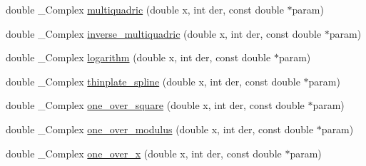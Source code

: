 \begin{CompactItemize}
\item 
\hypertarget{group__applications__fastsum_g44a58143a1f5c79b45c538134117e091}{
double \_\-Complex \hyperlink{group__applications__fastsum_g44a58143a1f5c79b45c538134117e091}{multiquadric} (double x, int der, const double $\ast$param)}
\label{group__applications__fastsum_g44a58143a1f5c79b45c538134117e091}

\item 
\hypertarget{group__applications__fastsum_g889c2a1791e42bb8fa5a594588d68a5c}{
double \_\-Complex \hyperlink{group__applications__fastsum_g889c2a1791e42bb8fa5a594588d68a5c}{inverse\_\-multiquadric} (double x, int der, const double $\ast$param)}
\label{group__applications__fastsum_g889c2a1791e42bb8fa5a594588d68a5c}

\item 
\hypertarget{group__applications__fastsum_g91be4b7bcc7d3a415e6b9b6ccaec39a7}{
double \_\-Complex \hyperlink{group__applications__fastsum_g91be4b7bcc7d3a415e6b9b6ccaec39a7}{logarithm} (double x, int der, const double $\ast$param)}
\label{group__applications__fastsum_g91be4b7bcc7d3a415e6b9b6ccaec39a7}

\item 
\hypertarget{group__applications__fastsum_g7723414bb26fd9b1cc76686aeca57425}{
double \_\-Complex \hyperlink{group__applications__fastsum_g7723414bb26fd9b1cc76686aeca57425}{thinplate\_\-spline} (double x, int der, const double $\ast$param)}
\label{group__applications__fastsum_g7723414bb26fd9b1cc76686aeca57425}

\item 
\hypertarget{group__applications__fastsum_ged5f8559b7b7a24674318cb58856602b}{
double \_\-Complex \hyperlink{group__applications__fastsum_ged5f8559b7b7a24674318cb58856602b}{one\_\-over\_\-square} (double x, int der, const double $\ast$param)}
\label{group__applications__fastsum_ged5f8559b7b7a24674318cb58856602b}

\item 
\hypertarget{group__applications__fastsum_g635ef40090e33b4917a20ab62913ef05}{
double \_\-Complex \hyperlink{group__applications__fastsum_g635ef40090e33b4917a20ab62913ef05}{one\_\-over\_\-modulus} (double x, int der, const double $\ast$param)}
\label{group__applications__fastsum_g635ef40090e33b4917a20ab62913ef05}

\item 
\hypertarget{group__applications__fastsum_g6a6096569616d5cf9604c514f925581b}{
double \_\-Complex \hyperlink{group__applications__fastsum_g6a6096569616d5cf9604c514f925581b}{one\_\-over\_\-x} (double x, int der, const double $\ast$param)}
\label{group__applications__fastsum_g6a6096569616d5cf9604c514f925581b}


\end{CompactItemize}

